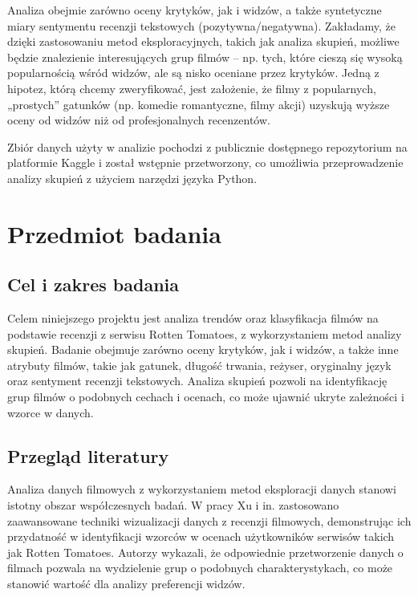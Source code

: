 \documentclass[a4paper,12pt,titlepage]{article}
\begin{document}
Analiza obejmie zarówno oceny krytyków, jak i widzów, a także syntetyczne miary sentymentu recenzji tekstowych (pozytywna/negatywna). Zakładamy, że dzięki zastosowaniu metod eksploracyjnych, takich jak analiza skupień, możliwe będzie znalezienie interesujących grup filmów – np. tych, które cieszą się wysoką popularnością wśród widzów, ale są nisko oceniane przez krytyków. Jedną z hipotez, którą chcemy zweryfikować, jest założenie, że filmy z popularnych, „prostych” gatunków (np. komedie romantyczne, filmy akcji) uzyskują wyższe oceny od widzów niż od profesjonalnych recenzentów.

Zbiór danych użyty w analizie pochodzi z publicznie dostępnego repozytorium na platformie Kaggle i został wstępnie przetworzony, co umożliwia przeprowadzenie analizy skupień z użyciem narzędzi języka Python.


\section{Przedmiot badania}

\subsection{Cel i zakres badania}

Celem niniejszego projektu jest analiza trendów oraz klasyfikacja filmów na podstawie recenzji z serwisu Rotten Tomatoes, z wykorzystaniem metod analizy skupień. Badanie obejmuje zarówno oceny krytyków, jak i widzów, a także inne atrybuty filmów, takie jak gatunek, długość trwania, reżyser, oryginalny język oraz sentyment recenzji tekstowych. Analiza skupień pozwoli na identyfikację grup filmów o podobnych cechach i ocenach, co może ujawnić ukryte zależności i wzorce w danych.

\subsection{Przegląd literatury}

Analiza danych filmowych z wykorzystaniem metod eksploracji danych stanowi istotny obszar współczesnych badań. W pracy Xu i in. \cite{xu2022} zastosowano zaawansowane techniki wizualizacji danych z recenzji filmowych, demonstrując ich przydatność w identyfikacji wzorców w ocenach użytkowników serwisów takich jak Rotten Tomatoes. Autorzy wykazali, że odpowiednie przetworzenie danych o filmach pozwala na wydzielenie grup o podobnych charakterystykach, co może stanowić wartość dla analizy preferencji widzów.
\end{document}
